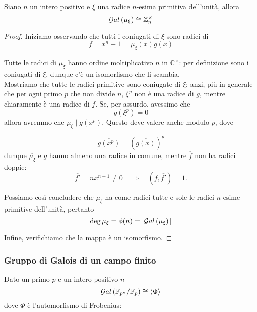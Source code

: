 \begin{multicols}{2}
	\begin{theorem}
		Siano $ n $ un intero positivo e $ \xi $ una radice $ n $-esima primitiva dell'unità, allora
		\[ \mathcal{G}al\left( \mu_{\xi} \right) \cong \mathbb{Z}_n^\times \]
	\end{theorem}
	
	\begin{proof} Iniziamo osservando che tutti i coniugati di $ \xi $ sono radici di
		\[ f = x^n -1 = \mu_\xi (x)  g(x)\]
		
		
		Tutte le radici di $ \mu_\xi $ hanno ordine moltiplicativo $ n $ in $ \mathbb{C}^\times $: per definizione sono i coniugati di $ \xi $, dunque c'è un isomorfismo che li scambia.\\
		
		Mostriamo che tutte le radici primitive sono coniugate di $ \xi $; anzi, più in generale che per ogni primo $ p $ che non divide $ n $, $ \xi^p $ non è una radice di $ g $, mentre chiaramente è una radice di $ f $. Se, per assurdo, avessimo che
		\[ g(\xi^p) = 0 \]
		allora avremmo che $ \mu_\xi \mid g(x^p) $. Questo deve valere anche modulo $ p $, dove
		
		\[ \overline{g(x^p)} = \left(\overline{g(x)}\right)^p \]
		dunque $ \overline{\mu_\xi} $ e $ \overline{g} $ hanno almeno una radice in comune, mentre $ \overline{f} $ non ha radici doppie:
		\[ \overline{f'} =  nx^{n-1} \neq 0 \quad\Rightarrow\quad (\overline{f}, \overline{f'}) = 1.   \]
		
		Possiamo così concludere che $ \mu_\xi $ ha come radici tutte e sole le radici $ n $-esime primitive dell'unità, pertanto
		\[ \deg\mu_\xi = \phi(n) = |\mathcal{G}al\left( \mu_\xi \right)| \]
		
		Infine, verifichiamo che la mappa
		è un isomorfismo.
	\end{proof}
	
	
	
	\subsubsection{Gruppo di Galois di un campo finito}
	\begin{theorem}[Frobenius]
	Dato un primo $ p $ e un intero positivo $ n $
	\[ \mathcal{G}al\left( \mathbb{F}_{p^n} /\mathbb{F}_p \right) \cong \langle \Phi \rangle \]
	dove $ \Phi $ è l'automorfismo di Frobenius: 
	\end{theorem}
	

\end{multicols}
